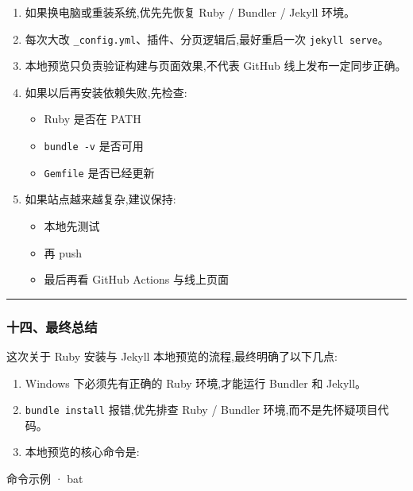 \documentclass[lang=cn,scheme=chinese,color=blue,device=normal,toc=onecol,math=cm]{elegantbook}
\begin{document}
\begin{enumerate}
\item 如果换电脑或重装系统,优先先恢复 Ruby /\allowbreak{} Bundler /\allowbreak{} Jekyll 环境。
\item 每次大改 \texttt{\_\allowbreak{}config.yml}、插件、分页逻辑后,最好重启一次 \texttt{jekyll serve}。
\item 本地预览只负责验证构建与页面效果,不代表 GitHub 线上发布一定同步正确。
\item 如果以后再安装依赖失败,先检查: 
\begin{itemize}
\item Ruby 是否在 PATH
\item \texttt{bundle -v} 是否可用
\item \texttt{Gemfile} 是否已经更新
\end{itemize}
\item 如果站点越来越复杂,建议保持: 
\begin{itemize}
\item 本地先测试
\item 再 push
\item 最后再看 GitHub Actions 与线上页面
\end{itemize}
\end{enumerate}


\medskip\hrule\medskip


\subsubsection{十四、最终总结}


这次关于 Ruby 安装与 Jekyll 本地预览的流程,最终明确了以下几点:\par


\begin{enumerate}
\item Windows 下必须先有正确的 Ruby 环境,才能运行 Bundler 和 Jekyll。
\item \texttt{bundle install} 报错,优先排查 Ruby /\allowbreak{} Bundler 环境,而不是先怀疑项目代码。
\item 本地预览的核心命令是:
\end{enumerate}


\begin{inlinecodebox}{命令示例 · bat}
\end{inlinecodebox}
\end{document}
